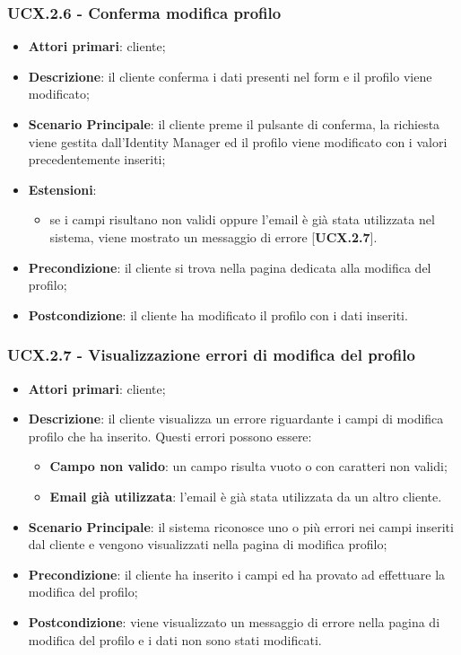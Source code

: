 \subsubsection{UCX.2.6 - Conferma modifica profilo}
\begin{itemize}
\item \textbf{Attori primari}: cliente;
\item \textbf{Descrizione}: il cliente conferma i dati presenti nel form e il profilo viene modificato;
\item \textbf{Scenario Principale}: il cliente preme il pulsante di conferma, la richiesta viene gestita dall'Identity Manager ed il profilo viene modificato con i valori precedentemente inseriti;
\item \textbf{Estensioni}: 
\begin{itemize}
\item se i campi risultano non validi oppure l'email è già stata utilizzata nel sistema, viene mostrato un messaggio di errore [\textbf{UCX.2.7}].
\end{itemize}
\item \textbf{Precondizione}: il cliente si trova nella pagina dedicata alla modifica del profilo;
\item \textbf{Postcondizione}: il cliente ha modificato il profilo con i dati inseriti.
\end{itemize}

\subsubsection{UCX.2.7 - Visualizzazione errori di modifica del profilo}
\begin{itemize}
\item \textbf{Attori primari}: cliente;
\item \textbf{Descrizione}: il cliente visualizza un errore riguardante i campi di modifica profilo che ha inserito. Questi errori possono essere:
\begin{itemize}
\item \textbf{Campo non valido}: un campo risulta vuoto o con caratteri non validi;
\item \textbf{Email già utilizzata}: l'email è già stata utilizzata da un altro cliente.
\end{itemize}
\item \textbf{Scenario Principale}: il sistema riconosce uno o più errori nei campi inseriti dal cliente e vengono visualizzati nella pagina di modifica profilo;
\item \textbf{Precondizione}: il cliente ha inserito i campi ed ha provato ad effettuare la modifica del profilo;
\item \textbf{Postcondizione}: viene visualizzato un messaggio di errore nella pagina di modifica del profilo e i dati non sono stati modificati.
\end{itemize}

